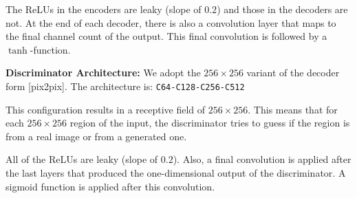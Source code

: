 \documentclass{llncs}
\begin{document}
\begin{subappendices}
The ReLUs in the encoders are leaky (slope of $0.2$) and those in the decoders are not. At the end of each decoder, there is also a convolution layer that maps to the final channel count of the output. This final convolution is followed by a $\tanh$-function.

\noindent\textbf{Discriminator Architecture:}
We adopt the $256\times256$ variant of the decoder form [pix2pix]. The architecture is: \texttt{C64-C128-C256-C512}

This configuration results in a receptive field of $256\times256$. This means that for each $256\times256$ region of the input, the discriminator tries to guess if the region is from a real image or from a generated one.

All of the ReLUs are leaky (slope of $0.2$). Also, a final convolution is applied after the last layers that produced the one-dimensional output of the discriminator. A sigmoid function is applied after this convolution.
\end{subappendices}
\end{document}
